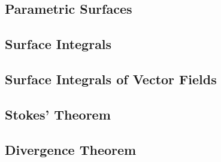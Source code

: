 \documentclass[12pt]{article}
\theoremstyle{definition}
\begin{document}
\subsection{Parametric Surfaces}

\subsection{Surface Integrals}

\subsection{Surface Integrals of Vector Fields}

\subsection{Stokes' Theorem}

\subsection{Divergence Theorem}
\end{document}
